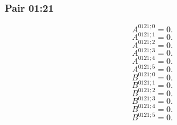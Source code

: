 \documentclass[11pt,a4paper]{article}
\begin{document}
\subsubsection{Pair 01:21}
\begin{equation}
A^{0121;0}=0.
\label{eq:cat-map-138}
\end{equation}
\begin{equation}
A^{0121;1}=0.
\label{eq:cat-map-139}
\end{equation}
\begin{equation}
A^{0121;2}=0.
\label{eq:cat-map-140}
\end{equation}
\begin{equation}
A^{0121;3}=0.
\label{eq:cat-map-141}
\end{equation}
\begin{equation}
A^{0121;4}=0.
\label{eq:cat-map-142}
\end{equation}
\begin{equation}
A^{0121;5}=0.
\label{eq:cat-map-143}
\end{equation}
\begin{equation}
B^{0121;0}=0.
\label{eq:cat-map-144}
\end{equation}
\begin{equation}
B^{0121;1}=0.
\label{eq:cat-map-145}
\end{equation}
\begin{equation}
B^{0121;2}=0.
\label{eq:cat-map-146}
\end{equation}
\begin{equation}
B^{0121;3}=0.
\label{eq:cat-map-147}
\end{equation}
\begin{equation}
B^{0121;4}=0.
\label{eq:cat-map-148}
\end{equation}
\begin{equation}
B^{0121;5}=0.
\label{eq:cat-map-149}
\end{equation}
\end{document}
